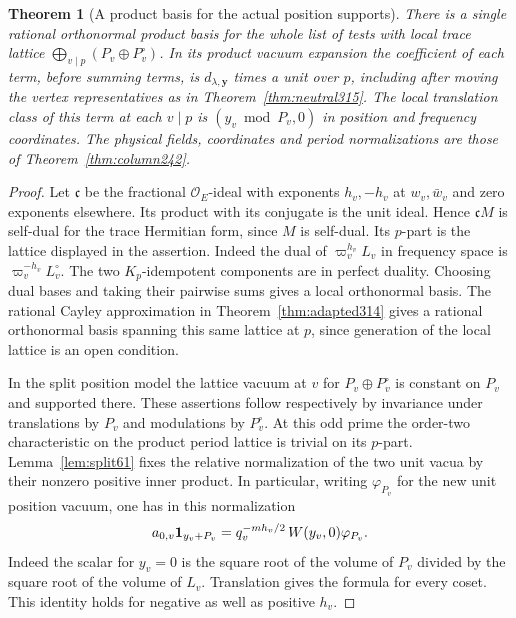 \documentclass[a4paper,11pt]{article}
\newtheorem{theorem}[proposition]{Theorem}
\theoremstyle{definition}
\theoremstyle{remark}
\numberwithin{equation}{section}
\newcommand{\OO}{\mathcal O}
\begin{document}
\begin{theorem}[A product basis for the actual position supports]\leavevmode
\label{thm:posframe316}
There is a single rational orthonormal product basis for the
whole list of tests with local trace lattice
\(\bigoplus_{v\mid p}(P_v\oplus P_v^\circ)\).
In its product vacuum expansion the coefficient of each term,
before summing terms, is \(d_{\lambda,\mathbf y}\) times a
unit over \(p\), including after moving the vertex representatives
as in Theorem~\ref{thm:neutral315}. The local translation class
of this term at each \(v\mid p\) is \((y_v\bmod P_v,0)\) in
position and frequency coordinates. The physical fields,
coordinates and period normalizations are those of
Theorem~\ref{thm:column242}.
\end{theorem}
\begin{proof}
Let \(\mathfrak c\) be the fractional \(\OO_E\)-ideal with
exponents \(h_v,-h_v\) at \(w_v,\bar w_v\) and zero exponents
elsewhere. Its product with its conjugate is the unit ideal.
Hence \(\mathfrak c M\) is self-dual for the trace Hermitian form,
since \(M\) is self-dual. Its \(p\)-part is the lattice displayed
in the assertion. Indeed the dual of \(\varpi_v^{h_v}L_v\)
in frequency space is \(\varpi_v^{-h_v}L_v^\circ\).
The two \(K_p\)-idempotent components are in perfect duality.
Choosing dual bases and taking their pairwise sums gives a
local orthonormal basis. The rational Cayley approximation in
Theorem~\ref{thm:adapted314} gives a rational orthonormal
basis spanning this same lattice at \(p\), since generation
of the local lattice is an open condition.

In the split position model the lattice vacuum at \(v\) for
\(P_v\oplus P_v^\circ\) is constant on \(P_v\) and supported
there. These assertions follow respectively by invariance under
translations by \(P_v\) and modulations by \(P_v^\circ\). At
this odd prime the order-two characteristic on the product
period lattice is trivial on its \(p\)-part. Lemma~\ref{lem:split61}
fixes the relative normalization of the two unit vacua by their
nonzero positive inner product. In particular, writing
\(\varphi_{P_v}\) for the new unit position vacuum, one has in
this normalization
\[
       a_{0,v}{\bf1}_{y_v+P_v}
          = q_v^{-m h_v/2}\, W(y_v,0)\varphi_{P_v}.
\]
Indeed the scalar for \(y_v=0\) is the square root of the
volume of \(P_v\) divided by the square root of the volume
of \(L_v\). Translation gives the formula for every coset.
This identity holds for negative as well as positive \(h_v\).


\end{proof}
\end{document}
